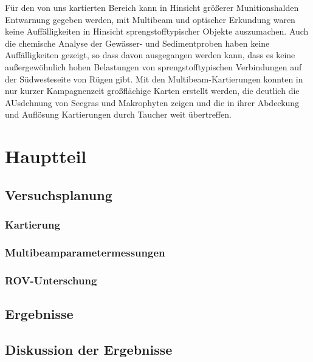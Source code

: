 \documentclass[12pt,titlepage]{scrreprt}
\begin{document}
Für den von uns kartierten Bereich kann in Hinsicht größerer Munitionshalden Entwarnung gegeben werden, mit Multibeam und optischer Erkundung waren keine Auffälligkeiten in Hinsicht sprengstofftypischer Objekte auszumachen. Auch die chemische Analyse der Gewässer- und Sedimentproben haben keine Auffälligkeiten gezeigt, so dass davon ausgegangen werden kann, dass es keine außergewöhnlich hohen Belastungen von sprengstofftypischen Verbindungen auf der Südwesteseite von Rügen gibt. Mit den Multibeam-Kartierungen konnten in nur kurzer Kampagnenzeit  großflächige Karten erstellt werden, die deutlich die AUsdehnung von Seegras und Makrophyten zeigen und die in ihrer Abdeckung und Auflösung Kartierungen durch Taucher weit übertreffen.

\tableofcontents

\chapter{Hauptteil}
\section{Versuchsplanung}
\subsection{Kartierung}

%
\subsection{Multibeamparametermessungen}

\subsection{ROV-Unterschung}

\section{Ergebnisse}
\section{Diskussion der Ergebnisse}






\end{document}
